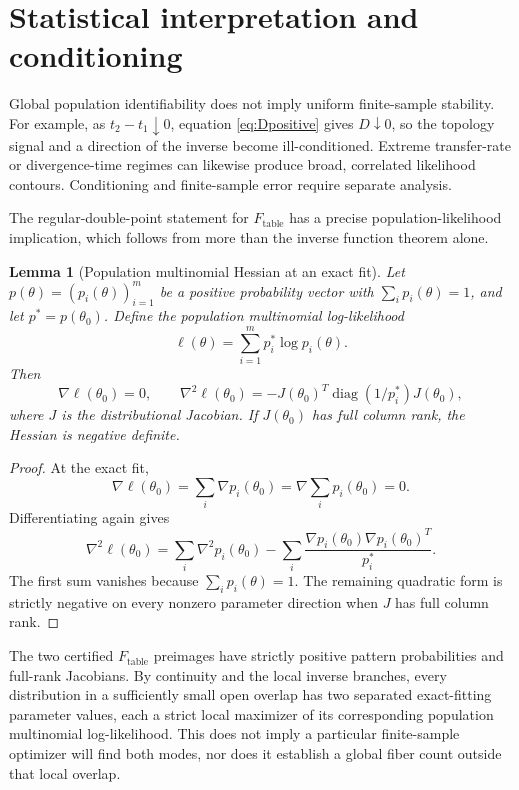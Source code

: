 \documentclass[11pt]{article}
\newtheorem{lemma}[theorem]{Lemma}
\newcommand{\Table}{F_{\mathrm{table}}}
\begin{document}
\section{Statistical interpretation and conditioning}\label{sec:statistics}

Global population identifiability does not imply uniform finite-sample stability.  For example, as $t_2-t_1\downarrow0$, equation \eqref{eq:Dpositive} gives $D\downarrow0$, so the topology signal and a direction of the inverse become ill-conditioned.  Extreme transfer-rate or divergence-time regimes can likewise produce broad, correlated likelihood contours.  Conditioning and finite-sample error require separate analysis.

The regular-double-point statement for $\Table$ has a precise population-likelihood implication, which follows from more than the inverse function theorem alone.

\begin{lemma}[Population multinomial Hessian at an exact fit]\label{lem:hessian}
Let $p(\theta)=(p_i(\theta))_{i=1}^m$ be a positive probability vector with $\sum_i p_i(\theta)=1$, and let $p^*=p(\theta_0)$.  Define the population multinomial log-likelihood
\[
\ell(\theta)=\sum_{i=1}^{m}p_i^*\log p_i(\theta).
\]
Then
\[
\nabla\ell(\theta_0)=0,
\qquad
\nabla^2\ell(\theta_0)
=-J(\theta_0)^T\operatorname{diag}(1/p_i^*)J(\theta_0),
\]
where $J$ is the distributional Jacobian.  If $J(\theta_0)$ has full column rank, the Hessian is negative definite.
\end{lemma}
\begin{proof}
At the exact fit,
\[
\nabla\ell(\theta_0)=\sum_i \nabla p_i(\theta_0)
=\nabla\sum_i p_i(\theta_0)=0.
\]
Differentiating again gives
\[
\nabla^2\ell(\theta_0)
=\sum_i\nabla^2p_i(\theta_0)
-\sum_i\frac{\nabla p_i(\theta_0)\nabla p_i(\theta_0)^T}{p_i^*}.
\]
The first sum vanishes because $\sum_i p_i(\theta)=1$.  The remaining quadratic form is strictly negative on every nonzero parameter direction when $J$ has full column rank.
\end{proof}

The two certified $\Table$ preimages have strictly positive pattern probabilities and full-rank Jacobians.  By continuity and the local inverse branches, every distribution in a sufficiently small open overlap has two separated exact-fitting parameter values, each a strict local maximizer of its corresponding population multinomial log-likelihood.  This does not imply a particular finite-sample optimizer will find both modes, nor does it establish a global fiber count outside that local overlap.
\end{document}
